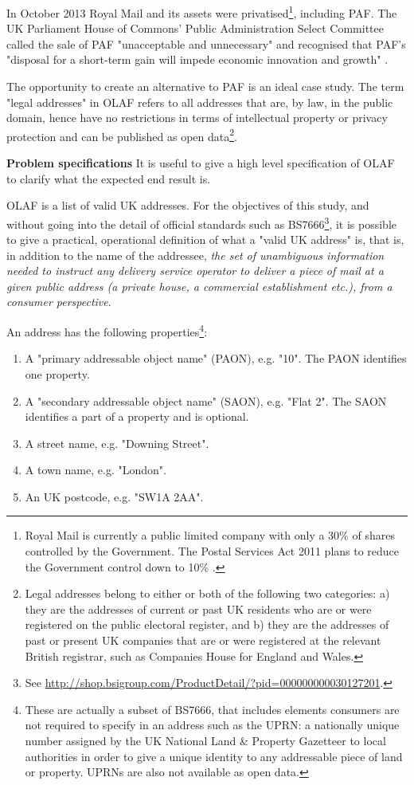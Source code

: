 In October 2013 Royal Mail and its assets were privatised\footnote{Royal Mail is currently a public limited company with only a 30\% of shares controlled by the Government. The Postal Services Act 2011 plans to reduce the Government control down to 10\% \cite{postalserviceact2011}.}, including PAF. The UK Parliament House of Commons' Public Administration Select Committee called the sale of PAF "unacceptable and unnecessary" and recognised that PAF's "disposal for a short-term gain will impede economic innovation and growth" \cite{pascod}.

The opportunity to create an alternative to PAF is an ideal case study. The term "legal addresses" in OLAF refers to all addresses that are, by law, in the public domain, hence have no restrictions in terms of intellectual property or privacy protection and can be published as open data\footnote{Legal addresses belong to either or both of the following two categories: a) they are the addresses of current or past UK residents who are or were registered on the public electoral register, and b) they are the addresses of past or present UK companies that are or were registered at the relevant British registrar, such as Companies House for England and Wales.}.

\textbf{Problem specifications} It is useful to give a high level specification of OLAF to clarify what the expected end result is. 

OLAF is a list of valid UK addresses. For the objectives of this study, and without going into the detail of official standards such as BS7666\footnote{See \url{http://shop.bsigroup.com/ProductDetail/?pid=000000000030127201}.}, it is possible to give a practical, operational definition of what a "valid UK address" is, that is, in addition to the name of the addressee, {\it the set of unambiguous information needed to instruct any delivery service operator to deliver a piece of mail at a given public address (a private house, a commercial establishment etc.), from a consumer perspective}. 

An address has the following properties\footnote{These are actually a subset of BS7666, that includes elements consumers are not required to specify in an address such as the UPRN: a nationally unique number assigned by the UK National Land \& Property Gazetteer to local authorities in order to give a unique identity to any addressable piece of land or property. UPRNs are also not available as open data.}:

\begin{enumerate}
    \item A "primary addressable object name" (PAON), e.g. "10". The PAON identifies one property.
    \item A "secondary addressable object name" (SAON), e.g. "Flat 2". The SAON identifies a part of a property and is optional.
    \item A street name, e.g. "Downing Street".
    \item A town name, e.g. "London".
    \item An UK postcode, e.g. "SW1A 2AA".
\end{enumerate}

